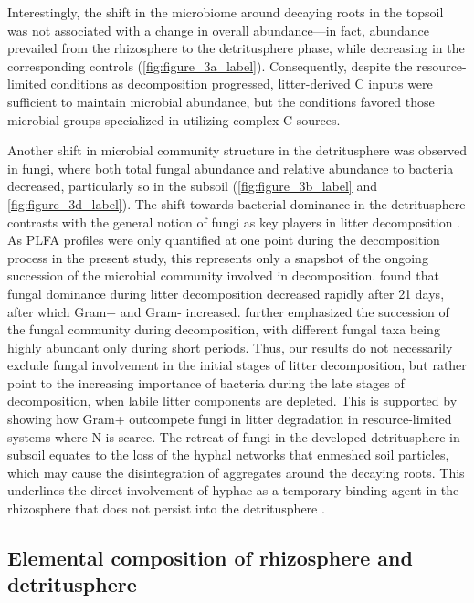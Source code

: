 Interestingly, the shift in the microbiome around decaying roots in the topsoil was not associated with a change in overall abundance---in fact, abundance prevailed from the rhizosphere to the detritusphere phase, while decreasing in the corresponding controls (\cref{fig:figure_3a_label}). Consequently, despite the resource-limited conditions as decomposition progressed, litter-derived C inputs were sufficient to maintain microbial abundance, but the conditions favored those microbial groups specialized in utilizing complex C sources.

Another shift in microbial community structure in the detritusphere was observed in fungi, where both total fungal abundance and relative abundance to bacteria decreased, particularly so in the subsoil (\cref{fig:figure_3b_label} and \cref{fig:figure_3d_label}). The shift towards bacterial dominance in the detritusphere contrasts with the general notion of fungi as key players in litter decomposition \citep{Williams2006, Voriskova2013}. As PLFA profiles were only quantified at one point during the decomposition process in the present study, this represents only a snapshot of the ongoing succession of the microbial community involved in decomposition. \citet{Herman2012} found that fungal dominance during litter decomposition decreased rapidly after 21 days, after which Gram+ and Gram- increased. \citet{Voriskova2013} further emphasized the succession of the fungal community during decomposition, with different fungal taxa being highly abundant only during short periods. Thus, our results do not necessarily exclude fungal involvement in the initial stages of litter decomposition, but rather point to the increasing importance of bacteria during the late stages of decomposition, when labile litter components are depleted. This is supported by \citet{Esperschuetz2011} showing how Gram+ outcompete fungi in litter degradation in resource-limited systems where N is scarce. The retreat of fungi in the developed detritusphere in subsoil equates to the loss of the hyphal networks that enmeshed soil particles, which may cause the disintegration of aggregates around the decaying roots. This underlines the direct involvement of hyphae as a temporary binding agent in the rhizosphere that does not persist into the detritusphere \citep{Six2004}.

\subsection{Elemental composition of rhizosphere and detritusphere}

